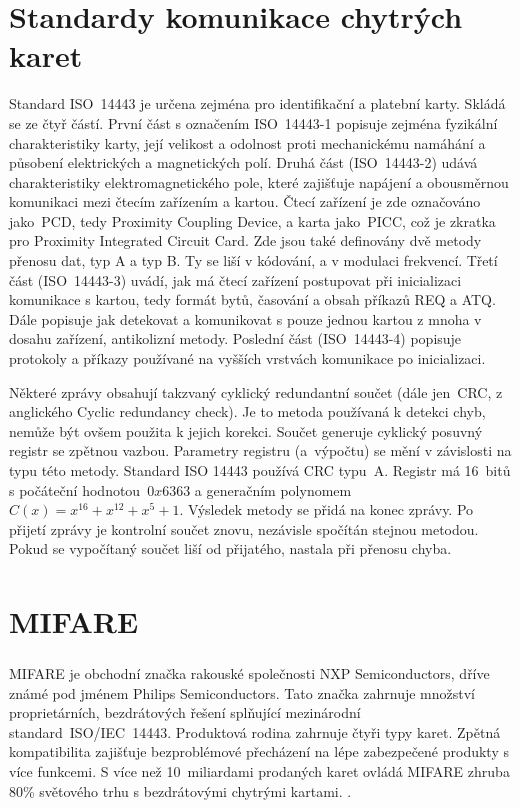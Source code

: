 \section{Standardy komunikace chytrých karet}
Standard ISO~14443 je určena zejména pro identifikační a platební karty. Skládá se ze čtyř částí. První část s označením {ISO~14443-1} popisuje zejména fyzikální charakteristiky karty, její velikost a odolnost proti mechanickému namáhání a působení elektrických a magnetických polí. Druhá část ({ISO~14443-2}) udává charakteristiky elektromagnetického pole, které zajišťuje napájení a obousměrnou komunikaci mezi čtecím zařízením a kartou. Čtecí zařízení je zde označováno jako~PCD, tedy Proximity Coupling Device, a karta jako~PICC, což je zkratka pro Proximity Integrated Circuit Card. Zde jsou také definovány dvě metody přenosu dat, typ A a typ B. Ty se liší v kódování, a v modulaci frekvencí. Třetí část ({ISO~14443-3}) uvádí, jak má čtecí zařízení postupovat při inicializaci komunikace s kartou, tedy formát bytů, časování a obsah příkazů REQ a ATQ. Dále popisuje jak detekovat a komunikovat s pouze jednou kartou z mnoha v dosahu zařízení, antikolizní metody. Poslední část ({ISO~14443-4})  popisuje protokoly a příkazy používané na vyšších vrstvách komunikace po inicializaci\cite{ISO14443}.
\par
Některé zprávy obsahují takzvaný cyklický redundantní součet (dále jen~CRC, z anglického Cyclic redundancy check). Je to metoda používaná k detekci chyb, nemůže být ovšem použita k jejich korekci. Součet generuje cyklický posuvný registr se zpětnou vazbou. Parametry registru (a~výpočtu) se mění v závislosti na typu této metody. Standard ISO 14443 používá CRC typu~A. Registr má 16~bitů s počáteční hodnotou~$0x6363$ a generačním polynomem $C(x) = x^{16} + x^{12} + x^5 + 1$. Výsledek metody se přidá na konec zprávy. Po přijetí zprávy je kontrolní součet znovu, nezávisle spočítán stejnou metodou. Pokud se vypočítaný součet liší od přijatého, nastala při přenosu chyba\cite{Smart_card_handbook}\cite{ISO14443}.


\section{MIFARE\textsuperscript{\textregistered}}
MIFARE\textsuperscript{\textregistered} je obchodní značka rakouské společnosti NXP Semiconductors, dříve známé pod jménem Philips Semiconductors. Tato značka zahrnuje množství proprietárních, bezdrátových řešení splňující mezinárodní standard~ISO/IEC~14443. Produktová rodina zahrnuje čtyři typy karet. Zpětná kompatibilita zajišťuje bezproblémové přecházení na lépe zabezpečené produkty s více funkcemi. S více než 10~miliardami prodaných karet ovládá MIFARE zhruba 80\% světového trhu s bezdrátovými chytrými kartami. 
\cite{About_MIFARE}\cite{Dismantling_Mifare_Classic}.

